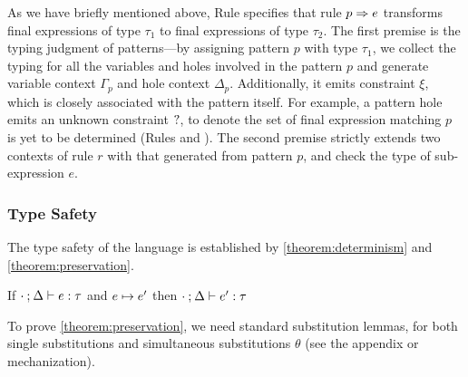 As we have briefly mentioned above, Rule \TRule specifies that rule
$p \Rightarrow e$ transforms final expressions of type $\tau_1$ to final expressions
of type $\tau_2$. The first premise is the typing judgment of patterns---by
assigning pattern $p$ with type $\tau_1$, we collect the typing for all the
variables and holes involved in the pattern $p$ and generate variable context
$\Gamma_p$ and hole context $\Delta_p$. Additionally, it emits constraint $\xi$,
which is closely associated with the pattern itself. For example, a pattern hole emits an 
unknown constraint $\mathtt{?}$, to denote the set of final expression
matching $p$ is yet to be determined (Rules \PTEHole and \PTHole). The second premise strictly extends two contexts of
rule $r$ with that generated from pattern $p$, and check the type of
sub-expression $e$.

\subsubsection{Type Safety}
The type safety of the language is established by
\autoref{theorem:determinism} and \autoref{theorem:preservation}.

\begin{theorem}[Preservation]
  \label{theorem:preservation}
  If $\cdot \mathbin{;} \Delta \vdash e : \tau$ and $e \mapsto e'$
  then $\cdot \mathbin{;} \Delta \vdash e' : \tau$
\end{theorem}

% 


To prove \autoref{theorem:preservation}, we need standard substitution lemmas, for both single substitutions and simultaneous substitutions $\theta$ (see the appendix or mechanization).



